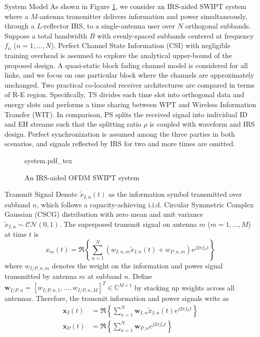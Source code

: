 \documentclass{IEEEtran}
\begin{document}
\begin{section}{System Model}
	As shown in Figure \ref{fi:system}, we consider an IRS-aided SWIPT system where a $M$-antenna transmitter delivers information and power simultaneously, through a $L$-reflector IRS, to a single-antenna user over $N$ orthogonal subbands. Suppose a total bandwidth $B$ with evenly-spaced subbands centered at frequency $f_n$ ($n=1,\dots,N$). Perfect Channel State Information (CSI) with negligible training overhead is assumed to explore the analytical upper-bound of the proposed design. A quasi-static block fading channel model is considered for all links, and we focus on one particular block where the channels are approximately unchanged. Two practical co-located receiver architectures are compared in terms of R-E region. Specifically, TS divides each time slot into orthogonal data and energy slots and performs a time sharing between WPT and Wireless Information Transfer (WIT). In comparison, PS splits the received signal into individual ID and EH streams such that the splitting ratio $\rho$ is coupled with waveform and IRS design. Perfect synchronization is assumed among the three parties in both scenarios, and signals reflected by IRS for two and more times are omitted.

	\begin{figure}
		\centering
		\def\svgwidth{\columnwidth}
		{system.pdf_tex}
		\caption{An IRS-aided OFDM SWIPT system}
		\label{fi:system}
	\end{figure}

	\begin{subsection}{Transmit Signal}
		Denote $\tilde{x}_{I,n}(t)$ as the information symbol transmitted over subband $n$, which follows a capacity-achieving i.i.d. Circular Symmetric Complex Gaussian (CSCG) distribution with zero mean and unit variance $\tilde{x}_{I,n}\sim\mathcal{CN}(0,1)$. The superposed transmit signal on antenna $m$ ($m=1,\dots,M$) at time $t$ is
		\begin{equation}\label{eq:x_m}
			x_m(t)=\Re\left\{\sum_{n=1}^N\left({w_{I,n,m}\tilde{x}_{I,n}(t)}+w_{P,n,m}\right){e^{j2{\pi}{f_n}{t}}}\right\}
		\end{equation}
		where $w_{I/P,n,m}$ denotes the weight on the information and power signal transmitted by antenna $m$ at subband $n$. Define $\boldsymbol{w}_{I/P,n}=[w_{I/P,n,1},\dots,w_{I/P,n,M}]^T \in \mathbb{C}^{M \times 1}$ by stacking up weights across all antennas. Therefore, the transmit information and power signals write as
		\begin{align}
			\boldsymbol{x}_{I}(t) &= \Re{\left\{\sum_{n=1}^N\boldsymbol{w}_{I,n}\tilde{x}_{I,n}(t){e^{j2{\pi}{f_n}{t}}}\right\}}\label{eq:x_I}\\
			\boldsymbol{x}_{P}(t) &= \Re{\left\{\sum_{n=1}^N\boldsymbol{w}_{P,n}{e^{j2{\pi}{f_n}{t}}}\right\}}\label{eq:x_P}
		\end{align}
	\end{subsection}


\end{section}
\end{document}

